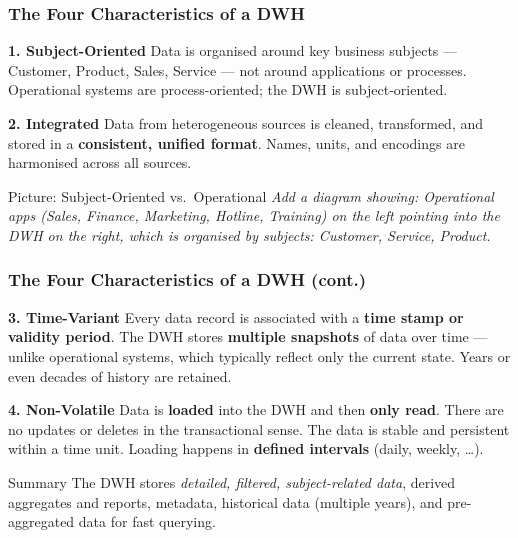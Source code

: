 \begin{frame}
  \frametitle{The Four Characteristics of a DWH}

  \begin{block}{\textbf{1. Subject-Oriented}}
    Data is organised around key business subjects --- Customer, Product,
    Sales, Service --- not around applications or processes.
    Operational systems are process-oriented; the DWH is subject-oriented.
  \end{block}

  \begin{block}{\textbf{2. Integrated}}
    Data from heterogeneous sources is cleaned, transformed, and stored
    in a \textbf{consistent, unified format}.
    Names, units, and encodings are harmonised across all sources.
  \end{block}

  \begin{alertblock}{Picture: Subject-Oriented vs.\ Operational}
    \textit{Add a diagram showing: Operational apps (Sales, Finance,
    Marketing, Hotline, Training) on the left pointing into the DWH
    on the right, which is organised by subjects: Customer, Service, Product.}
  \end{alertblock}
\end{frame}

\begin{frame}
  \frametitle{The Four Characteristics of a DWH (cont.)}

  \begin{block}{\textbf{3. Time-Variant}}
    Every data record is associated with a \textbf{time stamp or validity period}.
    The DWH stores \textbf{multiple snapshots} of data over time --- unlike
    operational systems, which typically reflect only the current state.
    Years or even decades of history are retained.
  \end{block}

  \begin{block}{\textbf{4. Non-Volatile}}
    Data is \textbf{loaded} into the DWH and then \textbf{only read}.
    There are no updates or deletes in the transactional sense.
    The data is stable and persistent within a time unit.
    Loading happens in \textbf{defined intervals} (daily, weekly, \ldots).
  \end{block}

  \begin{examples}{Summary}
    The DWH stores \textit{detailed, filtered, subject-related data},
    derived aggregates and reports, metadata, historical data (multiple years),
    and pre-aggregated data for fast querying.
  \end{examples}
\end{frame}

